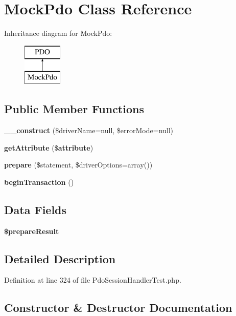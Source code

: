 \section{Mock\+Pdo Class Reference}
\label{class_symfony_1_1_component_1_1_http_foundation_1_1_tests_1_1_session_1_1_storage_1_1_handler_1_1_mock_pdo}
Inheritance diagram for Mock\+Pdo\+:\begin{figure}[H]
\begin{center}
\leavevmode
\includegraphics[height=2.000000cm]{class_symfony_1_1_component_1_1_http_foundation_1_1_tests_1_1_session_1_1_storage_1_1_handler_1_1_mock_pdo}
\end{center}
\end{figure}
\subsection*{Public Member Functions}
\begin{DoxyCompactItemize}
\item 
{\bf \+\_\+\+\_\+construct} (\$driver\+Name=null, \$error\+Mode=null)
\item 
{\bf get\+Attribute} (\${\bf attribute})
\item 
{\bf prepare} (\$statement, \$driver\+Options=array())
\item 
{\bf begin\+Transaction} ()
\end{DoxyCompactItemize}
\subsection*{Data Fields}
\begin{DoxyCompactItemize}
\item 
{\bf \$prepare\+Result}
\end{DoxyCompactItemize}


\subsection{Detailed Description}


Definition at line 324 of file Pdo\+Session\+Handler\+Test.\+php.



\subsection{Constructor \& Destructor Documentation}
